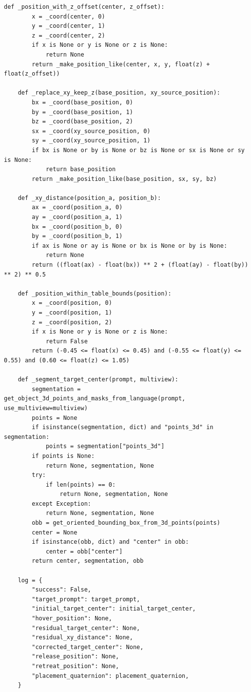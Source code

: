 \documentclass{llmxive}
\begin{document}
\begin{lstlisting}[style=ratsappendixpython]
    def _position_with_z_offset(center, z_offset):
        x = _coord(center, 0)
        y = _coord(center, 1)
        z = _coord(center, 2)
        if x is None or y is None or z is None:
            return None
        return _make_position_like(center, x, y, float(z) + float(z_offset))

    def _replace_xy_keep_z(base_position, xy_source_position):
        bx = _coord(base_position, 0)
        by = _coord(base_position, 1)
        bz = _coord(base_position, 2)
        sx = _coord(xy_source_position, 0)
        sy = _coord(xy_source_position, 1)
        if bx is None or by is None or bz is None or sx is None or sy is None:
            return base_position
        return _make_position_like(base_position, sx, sy, bz)

    def _xy_distance(position_a, position_b):
        ax = _coord(position_a, 0)
        ay = _coord(position_a, 1)
        bx = _coord(position_b, 0)
        by = _coord(position_b, 1)
        if ax is None or ay is None or bx is None or by is None:
            return None
        return ((float(ax) - float(bx)) ** 2 + (float(ay) - float(by)) ** 2) ** 0.5

    def _position_within_table_bounds(position):
        x = _coord(position, 0)
        y = _coord(position, 1)
        z = _coord(position, 2)
        if x is None or y is None or z is None:
            return False
        return (-0.45 <= float(x) <= 0.45) and (-0.55 <= float(y) <= 0.55) and (0.60 <= float(z) <= 1.05)

    def _segment_target_center(prompt, multiview):
        segmentation = get_object_3d_points_and_masks_from_language(prompt, use_multiview=multiview)
        points = None
        if isinstance(segmentation, dict) and "points_3d" in segmentation:
            points = segmentation["points_3d"]
        if points is None:
            return None, segmentation, None
        try:
            if len(points) == 0:
                return None, segmentation, None
        except Exception:
            return None, segmentation, None
        obb = get_oriented_bounding_box_from_3d_points(points)
        center = None
        if isinstance(obb, dict) and "center" in obb:
            center = obb["center"]
        return center, segmentation, obb

    log = {
        "success": False,
        "target_prompt": target_prompt,
        "initial_target_center": initial_target_center,
        "hover_position": None,
        "residual_target_center": None,
        "residual_xy_distance": None,
        "corrected_target_center": None,
        "release_position": None,
        "retreat_position": None,
        "placement_quaternion": placement_quaternion,
    }


\end{lstlisting}
\end{document}
